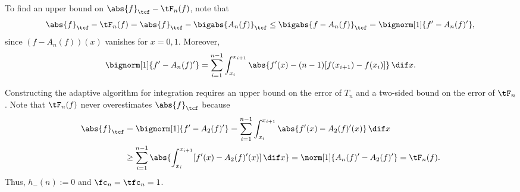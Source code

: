 \documentclass{iitthesis}
\theoremstyle{definition}
\theoremstyle{remark}
\newcommand{\Ftnorm}[1]{\abs{#1}_{\tcf}}
\begin{document}
To find an upper bound on $\Ftnorm{f}-\tF_{n}(f)$, note that
\begin{equation*}
\Ftnorm{f} - \tF_{n}(f) = \Ftnorm{f} - \bigabs{A_n(f)}_{\tcf} \le \bigabs{f-A_n(f)}_{\tcf} = \bignorm[1]{f' -A_n(f)'},
\end{equation*}
since $(f-A_n(f))(x)$ vanishes for $x=0,1$.  Moreover,
\begin{equation} \label{onenormfp}
\bignorm[1]{f' -A_n(f)'} = \sum_{i=1}^{n-1} \int_{x_i}^{x_{i+1}} \abs{f'(x) -(n-1)[f(x_{i+1})-f(x_i)]} \, \dif x.
\end{equation}


Constructing the adaptive algorithm for integration requires an upper bound on the error of $T_n$ and a two-sided bound on the error of $\tF_n$.  Note that $\tF_{n}(f)$ never overestimates $\Ftnorm{f}$ because
\begin{align*}
\Ftnorm{f} & = \bignorm[1]{f'-A_2(f)'}
= \sum_{i=1}^{n-1} \int_{x_i}^{x_{i+1}} \abs{f'(x) - A_2(f)'(x)} \, \dif x \\
& \ge \sum_{i=1}^{n-1} \abs{\int_{x_i}^{x_{i+1}} [f'(x) - A_2(f)'(x)] \, \dif x}=\norm[1]{A_n(f)'-A_2(f)'} = \tF_n(f).
\end{align*}
Thus, $h_{-}(n):=0$ and $\fc_n=\tfc_n=1$.
\end{document}
